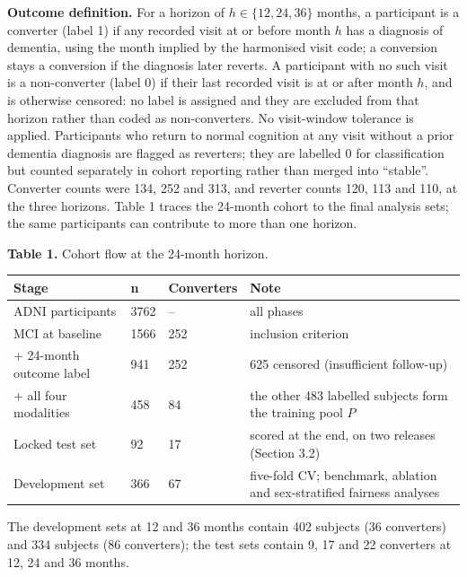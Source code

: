 \documentclass[12pt,twoside]{article}
\begin{document}
\begin{spacing}{1.0}
\textbf{Outcome definition.} For a horizon of $h\in\{12,24,36\}$ months, a
participant is a converter (label 1) if any recorded visit at or before month
$h$ has a diagnosis of dementia, using the month implied by the harmonised
visit code; a conversion stays a conversion if the diagnosis later reverts.
A participant with no such visit is a non-converter (label 0) if their last
recorded visit is at or after month $h$, and is otherwise censored: no label
is assigned and they are excluded from that horizon rather than coded as
non-converters. No visit-window tolerance is applied. Participants who
return to normal cognition at any visit without a prior dementia diagnosis
are flagged as reverters; they are labelled 0 for classification but
counted separately in cohort reporting rather than merged into ``stable''.
Converter counts were 134, 252 and 313, and reverter counts 120, 113 and
110, at the three horizons. Table 1 traces the 24-month cohort to the final
analysis sets; the same participants can contribute to more than one
horizon.

\begin{table}[!htbp]
\centering
\textbf{Table 1.} Cohort flow at the 24-month horizon.\\\vspace{5pt}
\small
\begin{tabular}{|M{4.0cm}|M{1.1cm}|M{1.9cm}|M{7.0cm}|}
\hline
\textbf{Stage} & \textbf{n} & \textbf{Converters} & \textbf{Note} \\
\hline
ADNI participants & 3762 & -- & all phases \\\hline
MCI at baseline & 1566 & 252 & inclusion criterion \\\hline
+ 24-month outcome label & 941 & 252 & 625 censored (insufficient follow-up) \\\hline
+ all four modalities & 458 & 84 & the other 483 labelled subjects form the training pool $P$ \\\hline
Locked test set & 92 & 17 & scored at the end, on two releases (Section 3.2) \\\hline
Development set & 366 & 67 & five-fold CV; benchmark, ablation and sex-stratified fairness analyses \\\hline
\end{tabular}
\end{table}

The development sets at 12 and 36 months contain 402 subjects (36
converters) and 334 subjects (86 converters); the test sets contain 9, 17 and
22 converters at 12, 24 and 36 months.


\end{spacing}
\end{document}
